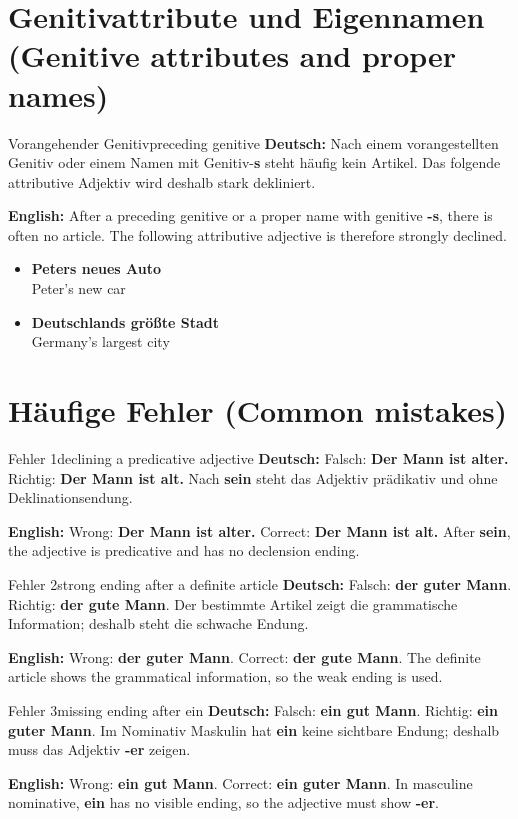 \documentclass[a4paper,11pt]{article}
\newcommand{\GermanText}[1]{\textbf{Deutsch: }#1\par}
\newcommand{\EnglishText}[1]{{\small\color{SoftGray}\textbf{English: }#1\par}}
\newcommand{\ExampleItem}[2]{\item \textbf{#1}\\{\small\color{SoftGray}#2}}
\begin{document}
\section{Genitivattribute und Eigennamen \textnormal{(Genitive attributes and proper names)}}

\begin{grammarentry}{Vorangehender Genitiv}{preceding genitive}
\GermanText{Nach einem vorangestellten Genitiv oder einem Namen mit Genitiv-\textbf{s} steht häufig kein Artikel. Das folgende attributive Adjektiv wird deshalb stark dekliniert.}
\EnglishText{After a preceding genitive or a proper name with genitive \textbf{-s}, there is often no article. The following attributive adjective is therefore strongly declined.}
\end{grammarentry}

\begin{exbox}
\begin{itemize}
\ExampleItem{Peters neues Auto}{Peter's new car}
\ExampleItem{Deutschlands größte Stadt}{Germany's largest city}
\end{itemize}
\end{exbox}

\section{Häufige Fehler \textnormal{(Common mistakes)}}

\begin{grammarentry}{Fehler 1}{declining a predicative adjective}
\GermanText{Falsch: \textbf{Der Mann ist alter.} Richtig: \textbf{Der Mann ist alt.} Nach \textbf{sein} steht das Adjektiv prädikativ und ohne Deklinationsendung.}
\EnglishText{Wrong: \textbf{Der Mann ist alter.} Correct: \textbf{Der Mann ist alt.} After \textbf{sein}, the adjective is predicative and has no declension ending.}
\end{grammarentry}

\begin{grammarentry}{Fehler 2}{strong ending after a definite article}
\GermanText{Falsch: \textbf{der guter Mann}. Richtig: \textbf{der gute Mann}. Der bestimmte Artikel zeigt die grammatische Information; deshalb steht die schwache Endung.}
\EnglishText{Wrong: \textbf{der guter Mann}. Correct: \textbf{der gute Mann}. The definite article shows the grammatical information, so the weak ending is used.}
\end{grammarentry}

\begin{grammarentry}{Fehler 3}{missing ending after ein}
\GermanText{Falsch: \textbf{ein gut Mann}. Richtig: \textbf{ein guter Mann}. Im Nominativ Maskulin hat \textbf{ein} keine sichtbare Endung; deshalb muss das Adjektiv \textbf{-er} zeigen.}
\EnglishText{Wrong: \textbf{ein gut Mann}. Correct: \textbf{ein guter Mann}. In masculine nominative, \textbf{ein} has no visible ending, so the adjective must show \textbf{-er}.}
\end{grammarentry}
\end{document}
